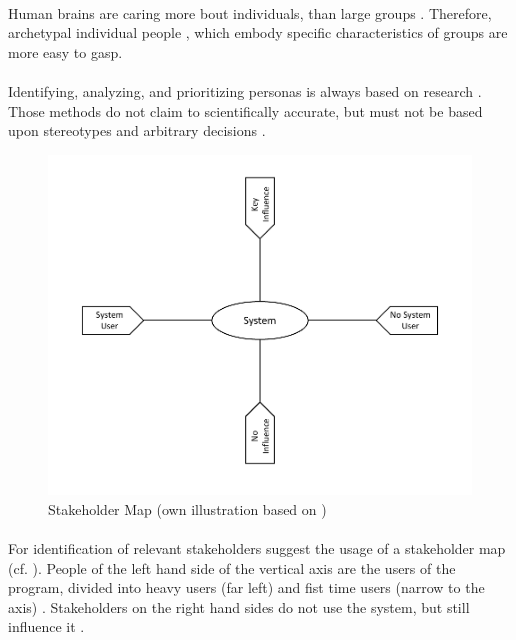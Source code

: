 \paragraph{} Human brains are caring more bout individuals, than large groups \parencite[cf.][]{Platt.2016}. Therefore, archetypal individual people \parencite[cf.][81-82]{Cooper.2007}, which embody specific characteristics of groups \parencite[cf.][]{Platt.2016} are more easy to gasp.

\paragraph{} Identifying, analyzing, and prioritizing personas is always based on research \parencites[cf.][39]{Robier.2016}[cf.][80]{Cooper.2007}. Those methods do not claim to scientifically accurate, but must not be based upon stereotypes and arbitrary decisions \parencite[cf.][82-83]{Cooper.2007}. 

\begin{figure}[H]
\centering
    \includegraphics[scale=0.7]{img/stakeholderMap.pdf}
    \caption[Stakeholder Map]{Stakeholder Map (own illustration based on \cite[38]{Robier.2016})}
    \label{fig:stakeMap}
\end{figure}

\paragraph{} For identification of relevant stakeholders \textcite[38]{Robier.2016} suggest the usage of a stakeholder map (cf. ). People of the left hand side of the vertical axis are the users of the program, divided into heavy users (far left) and fist time users (narrow to the axis) \parencite[cf.][38]{Robier.2016}. Stakeholders on the right hand sides do not use the system, but still influence it \parencite[cf.][38]{Robier.2016}. 

